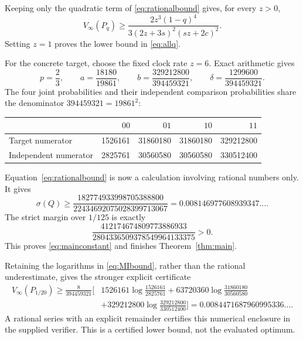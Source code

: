 \documentclass[11pt,a4paper]{article}
\newcommand{\sig}{\sigma}
\begin{document}
Keeping only the quadratic term of \eqref{eq:rationalbound} gives, for every $z>0$,
\begin{equation}\label{eq:familybound}
 V_\infty(P_q)\geq
 \frac{2z^3(1-q)^4}{3(2z+3s)^2(sz+2c)^2}.
\end{equation}
Setting $z=1$ proves the lower bound in \eqref{eq:allq}.

For the concrete target, choose the fixed clock rate $z=6$. Exact arithmetic gives
\begin{equation}\label{eq:numbers}
 p=\frac23,\qquad
 a=\frac{18180}{19861},\qquad
 b=\frac{329212800}{394459321},\qquad
 \delta=\frac{1299600}{394459321}.
\end{equation}
The four joint probabilities and their independent comparison probabilities share the denominator $394459321=19861^2$:
\begin{center}
\begin{tabular}{lrrrr}
\toprule
& $00$ & $01$ & $10$ & $11$\\
\midrule
Target numerator & 1526161 & 31860180 & 31860180 & 329212800\\
Independent numerator & 2825761 & 30560580 & 30560580 & 330512400\\
\bottomrule
\end{tabular}
\end{center}
Equation~\eqref{eq:rationalbound} is now a calculation involving rational numbers only. It gives
\[
 \sig(Q)\geq
 \frac{182774933998705388800}{22434692075028399713067}
 =0.008146977608939347\ldots.
\]
The strict margin over $1/125$ is exactly
\[
 \frac{412174674809773886933}{2804336509378549964133375}>0.
\]
This proves \eqref{eq:mainconstant} and finishes Theorem~\ref{thm:main}.

Retaining the logarithms in \eqref{eq:MIbound}, rather than the rational underestimate, gives the stronger explicit certificate
\begin{align*}
 V_\infty(P_{1/20})\geq \frac{8}{394459321}\bigg[&
 1526161\log\frac{1526161}{2825761}
 +63720360\log\frac{31860180}{30560580}\\
 &+329212800\log\frac{329212800}{330512400}\bigg]
 =0.0084471687960995336\ldots.
\end{align*}
A rational series with an explicit remainder certifies this numerical enclosure in the supplied verifier. This is a certified lower bound, not the evaluated optimum.
\end{document}
